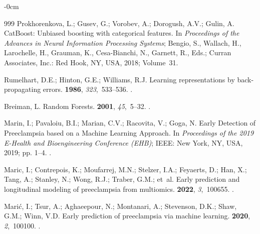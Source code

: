 \documentclass[diagnostics,article,accept,pdftex,moreauthors]{Definitions/mdpi}
\begin{document}
\begin{adjustwidth}{-\extralength}{0cm}
\begin{thebibliography}{999}
Prokhorenkova, L.; Gusev, G.; Vorobev, A.; Dorogush, A.V.; Gulin, A.
\newblock CatBoost: Unbiased boosting with categorical features.
\newblock In \emph{Proceedings of the Advances in Neural Information Processing
  Systems}; Bengio, S., Wallach, H., Larochelle, H., Grauman, K., Cesa-Bianchi,
  N., Garnett, R., Eds.; {Curran Associates, Inc.: Red Hook, NY,
    USA,} %
  2018; Volume~31.

Rumelhart, D.E.; Hinton, G.E.; Williams, R.J.
\newblock Learning representations by back-propagating errors.
 {\bf 1986}, {\em 323},~533--536.
.

Breiman, L.
\newblock Random Forests.
 {\bf 2001}, {\em 45},~5--32.
.

Marin, I.; Pavaloiu, B.I.; Marian, C.V.; Racovita, V.; Goga, N.
\newblock Early Detection of Preeclampsia based on a Machine Learning Approach.
\newblock In \emph{Proceedings of the 2019 E-Health and Bioengineering Conference
  (EHB)}; IEEE: {New York, NY, USA,} 
  2019; pp. 1--4.
.

Maric, I.; Contrepois, K.; Moufarrej, M.N.; Stelzer, I.A.; Feyaerts, D.; Han,
  X.; Tang, A.; Stanley, N.; Wong, R.J.; Traber, G.M.;  et~al.
\newblock Early prediction and longitudinal modeling of preeclampsia from
  multiomics.
 {\bf 2022}, {\em 3},~100655.
.

Mari\'c, I.; Tsur, A.; Aghaeepour, N.; Montanari, A.; Stevenson, D.K.; Shaw,
  G.M.; Winn, V.D.
\newblock Early prediction of preeclampsia via machine learning.
 {\bf 2020}, {\em 2},~100100.
.


\end{thebibliography}
\end{adjustwidth}
\end{document}

